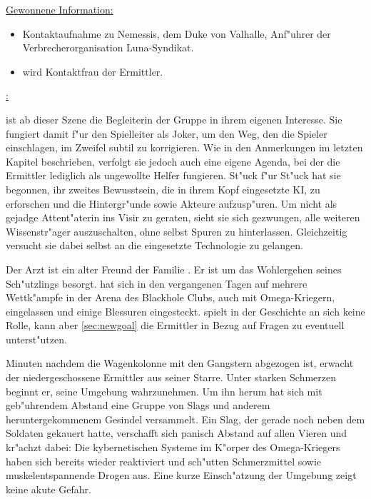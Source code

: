 \begin{remarks}
	\underline{Gewonnene Information:}
	
	\begin{itemize}
		\item Kontaktaufnahme zu Nemessis, dem Duke von Valhalle, Anf"uhrer der Verbrecherorganisation Luna-Syndikat.
		\item \xl{} wird Kontaktfrau der Ermittler.
	\end{itemize}

	\underline{\xl{}:}

	\xl{} ist ab dieser Szene die Begleiterin der Gruppe in ihrem eigenen Interesse. Sie fungiert damit f"ur den Spielleiter als Joker, um den Weg, den die Spieler einschlagen, im Zweifel subtil zu korrigieren. Wie in den Anmerkungen im letzten Kapitel beschrieben, verfolgt sie jedoch auch eine eigene Agenda, bei der die Ermittler lediglich als ungewollte Helfer fungieren. St"uck f"ur St"uck hat sie begonnen, ihr zweites Bewusstsein, die in ihrem Kopf eingesetzte KI, zu erforschen und die Hintergr"unde sowie Akteure aufzusp"uren.  Um nicht als gejadge Attent"aterin ins Visir zu geraten, sieht sie sich gezwungen, alle weiteren Wissenstr"ager auszuschalten, ohne selbst Spuren zu hinterlassen. Gleichzeitig versucht sie dabei selbst an die eingesetzte Technologie zu gelangen.

	\underline{ }

	Der Arzt   ist ein alter Freund der Familie . Er ist um das Wohlergehen seines Sch"utzlings \xl{} besorgt. \xl{} hat sich in den vergangenen Tagen auf mehrere Wettk"ampfe in der Arena des Blackhole Clubs, auch mit Omega-Kriegern, eingelassen und einige Blessuren eingesteckt.   spielt in der Geschichte an sich keine Rolle, kann aber  \cref{sec:newgoal} die Ermittler in Bezug auf Fragen zu \xl{} eventuell unterst"utzen.
\end{remarks}



Minuten nachdem die Wagenkolonne mit den Gangstern abgezogen ist, erwacht der niedergeschossene Ermittler aus seiner Starre. Unter starken Schmerzen beginnt er, seine Umgebung wahrzunehmen. Um ihn herum hat sich mit geb"uhrendem Abstand eine Gruppe von Slags und anderem heruntergekommenem Gesindel versammelt. Ein Slag, der gerade noch neben dem Soldaten gekauert hatte, verschafft sich panisch Abstand auf allen Vieren und kr"achzt dabei:  Die kybernetischen Systeme im K"orper des Omega-Kriegers haben sich bereits wieder reaktiviert und sch"utten Schmerzmittel sowie muskelentspannende Drogen aus. Eine kurze Einsch"atzung der Umgebung zeigt keine akute Gefahr.


